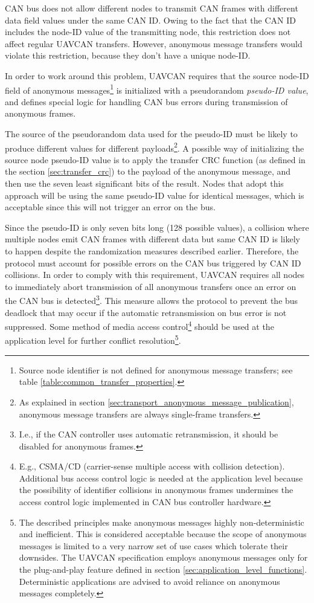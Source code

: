 CAN bus does not allow different nodes to transmit CAN frames with different data field values under the same CAN ID.
Owing to the fact that the CAN ID includes the node-ID value of the transmitting node,
this restriction does not affect regular UAVCAN transfers.
However, anonymous message transfers would violate this restriction,
because they don't have a unique node-ID.

In order to work around this problem,
UAVCAN requires that the source node-ID field of anonymous messages\footnote{Source node identifier
is not defined for anonymous message transfers; see table \ref{table:common_transfer_properties}.}
is initialized with a pseudorandom \emph{pseudo-ID value},
and defines special logic for handling CAN bus errors during transmission of anonymous frames.

The source of the pseudorandom data used for the pseudo-ID must be likely to produce different values
for different payloads\footnote{As explained in section \ref{sec:transport_anonymous_message_publication},
anonymous message transfers are always single-frame transfers.}.
A possible way of initializing the source node pseudo-ID value is to apply the transfer CRC function
(as defined in the section \ref{sec:transfer_crc})
to the payload of the anonymous message, and then use the seven least significant bits of the result.
Nodes that adopt this approach will be using the same pseudo-ID value for identical messages,
which is acceptable since this will not trigger an error on the bus.

Since the pseudo-ID is only seven bits long (128 possible values),
a collision where multiple nodes emit CAN frames with different data but same CAN ID is likely to happen
despite the randomization measures described earlier.
Therefore, the protocol must account for possible errors on the CAN bus triggered by CAN ID collisions.
In order to comply with this requirement,
UAVCAN requires all nodes to immediately abort transmission of all anonymous transfers once an error on
the CAN bus is detected\footnote{I.e., if the CAN controller uses automatic retransmission,
it should be disabled for anonymous frames.}.
This measure allows the protocol to prevent the bus deadlock that may occur if the automatic
retransmission on bus error is not suppressed.
Some method of media access control\footnote{%
    E.g., CSMA/CD (carrier-sense multiple access with collision detection).
    Additional bus access control logic is needed at the application level because
    the possibility of identifier collisions in anonymous frames undermines the access control logic implemented
    in CAN bus controller hardware.
}
should be used at the application level for further conflict resolution\footnote{%
    The described principles make anonymous messages highly non-deterministic and inefficient.
    This is considered acceptable because the scope of anonymous messages is limited to a very narrow set of use
    cases which tolerate their downsides. The UAVCAN specification employs anonymous messages only for the
    plug-and-play feature defined in section \ref{sec:application_level_functions}.
    Deterministic applications are advised to avoid reliance on anonymous messages completely.
}.

